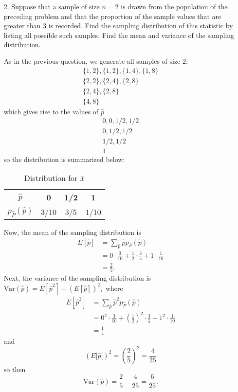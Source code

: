 \documentclass{article}
\newcommand{\var}{\mathrm{Var}}
\begin{document}
\begin{itemize}
	
	\newpage

	\item[2.] Suppose that a sample of size $n=2$ is drawn from the population of the preceding problem and that the proportion of the sample values that are greater than 3 is recorded. Find the sampling distribution of this statistic by listing all possible such samples. Find the mean and variance of the sampling distribution.
		\begin{soln}
			As in the previous question, we generate all samples of size 2:
			\begin{align*}
				\{1, 2\}, \{1, 2\}, \{1, 4\}, \{1, 8\} \\
				\{2, 2\}, \{2, 4\}, \{2, 8\} \\
				\{2, 4\}, \{2, 8\} \\
				\{4, 8\}
			\end{align*} which gives rise to the values of $\hat{p}$ 
			\begin{align*}
				0, 0, 1/2, 1/2 \\
				0, 1/2, 1/2 \\
				1/2, 1/2 \\
				1
			\end{align*}
			so the distribution is summarized below:
			\begin{center}
				\begin{table}[h!]
					\centering
					\caption{Distribution for $\bar{x}$}

					\begin{tabular}{c|ccc}
						$\hat{p}$ & 0 & 1/2 & 1 \\ 
						\hline
						$p_{\hat{P}}(\hat{p})$ & 3/10 & 3/5 & 1/10
					\end{tabular}

				\end{table}
			\end{center}
			Now, the mean of the sampling distribution is 
			\begin{align*}
				E[\hat{p}]&=\sum_{\hat{p}} \hat{p} p_{\hat{P}} (\hat{p}) \\
				&= 0\cdot\frac{3}{10} + \frac{1}{2}\cdot\frac{3}{5} + 1\cdot\frac{1}{10} \\
				&= \boxed{\frac{2}{5}.}
			\end{align*}
			Next, the variance of the sampling distribution is $\var(\hat{p}) = E[\hat{p}^2]-(E[\hat{p}])^2,$ where 
			\begin{align*}
				E[\hat{p}^2] &= \sum_{\hat{p}} \hat{p}^2 p_{\hat{P}}(\hat{p}) \\
				&= 0^2\cdot\frac{3}{10} + \left( \frac{1}{2} \right)^2\cdot\frac{3}{5} + 1^2\cdot\frac{1}{10} \\
				&= \frac{1}{4}
			\end{align*} and \[(E[\hat{p}[)^2 = \left( \frac{2}{5} \right)^2 = \frac{4}{25}\] so then \[\var(\hat{p}) = \frac{2}{5} - \frac{4}{25} = \boxed{\frac{6}{25}.}\]



\end{soln}
\end{itemize}
\end{document}
